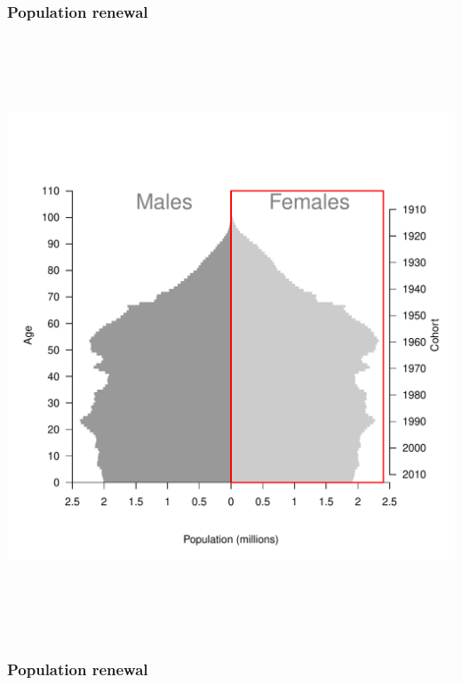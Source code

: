 \documentclass[20pt]{beamer}
\begin{document}
\begin{frame}
\frametitle{Population renewal}
\vspace{-2em}
\begin{center}
\includegraphics[height=7in,trim=20 20 20 20]{Figures/PopUSA20142.pdf}
\end{center}
\color{mygray}{This is where I explain renewal by waving my hands around. Ask
for equations if that helps!}
\end{frame}

\begin{frame}
\frametitle{Population renewal}
\vspace{-2em}
\begin{center}
\end{center}
\end{frame}
\end{document}
